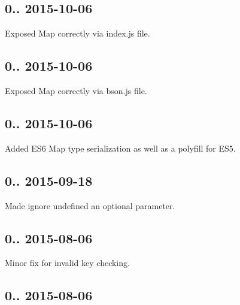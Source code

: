 \subsection*{0.. 2015-\/10-\/06 }


\begin{DoxyItemize}
\item Exposed Map correctly via index.\+js file.
\end{DoxyItemize}

\subsection*{0.. 2015-\/10-\/06 }


\begin{DoxyItemize}
\item Exposed Map correctly via bson.\+js file.
\end{DoxyItemize}

\subsection*{0.. 2015-\/10-\/06 }


\begin{DoxyItemize}
\item Added E\+S6 Map type serialization as well as a polyfill for E\+S5.
\end{DoxyItemize}

\subsection*{0.. 2015-\/09-\/18 }


\begin{DoxyItemize}
\item Made ignore undefined an optional parameter.
\end{DoxyItemize}

\subsection*{0.. 2015-\/08-\/06 }


\begin{DoxyItemize}
\item Minor fix for invalid key checking.
\end{DoxyItemize}

\subsection*{0.. 2015-\/08-\/06 }


